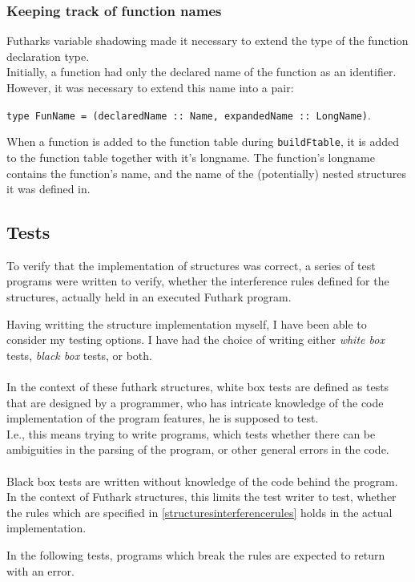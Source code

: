 \subsubsection{Keeping track of function names}
Futharks variable shadowing made it necessary to extend the type of the function
declaration type. \\
Initially, a function had only the declared name of the function as an identifier.
However, it was necessary to extend this name into a pair:

\texttt{type FunName = (declaredName :: Name, expandedName :: LongName)}.

When a function is added to the function table during \texttt{buildFtable}, it
is added to the function table together with it's longname. The function's
longname contains the function's name, and the name of the (potentially) nested
structures it was defined in.

\subsection{Tests}
\label{subsec:structuretests}
To verify that the implementation of structures was correct, a series of test
programs were written to verify, whether the interference rules defined for the
structures, actually held in an executed Futhark program.

Having writting the structure implementation myself, I have been able to
consider my testing options. I have had the choice of writing either \textit{white box}
tests, \textit{black box }tests, or both.
\\
\\
In the context of these futhark structures, white box tests are defined as tests
that are designed by a programmer, who has intricate knowledge of the
code implementation of the program features, he is supposed to test.\\
I.e., this means trying to write programs, which tests whether there can be
ambiguities in the parsing of the program, or other general errors in the code.
\\
\\
Black box tests are written without knowledge of the code behind the program.
In the context of Futhark structures, this limits the test writer to test,
whether the rules which are specified in \ref{structuresinterferencerules} holds
in the actual implementation.

In the following tests, programs which break the rules are expected to return
with an error.

